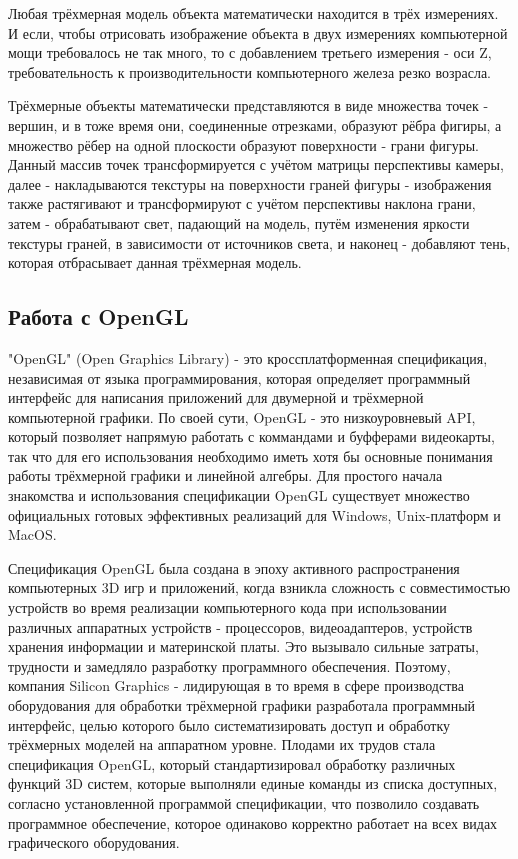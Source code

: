 Любая трёхмерная модель объекта математически находится в трёх измерениях. И если, чтобы отрисовать изображение объекта в двух измерениях компьютерной мощи требовалось не так много, то с добавлением третьего измерения - оси Z, требовательность к производительности компьютерного железа резко возрасла.

Трёхмерные объекты математически представляются в виде множества точек - вершин, и в тоже время они, соединенные отрезками, образуют рёбра фигиры, а множество рёбер на одной плоскости образуют поверхности - грани фигуры. Данный массив точек трансформируется с учётом матрицы перспективы камеры, далее - накладываются текстуры на поверхности граней фигуры - изображения также растягивают и трансформируют с учётом перспективы наклона грани, затем - обрабатывают свет, падающий на модель, путём изменения яркости текстуры граней, в зависимости от источников света, и наконец - добавляют тень, которая отбрасывает данная трёхмерная модель.
\subsection{Работа с OpenGL}

"OpenGL" (Open Graphics Library) - это кроссплатформенная спецификация, независимая от языка программирования, которая определяет программный интерфейс для написания приложений для двумерной и трёхмерной компьютерной графики. По своей сути, OpenGL - это низкоуровневый API, который позволяет напрямую работать с коммандами и буфферами видеокарты, так что для его использования необходимо иметь хотя бы основные понимания работы трёхмерной графики и линейной алгебры. Для простого начала знакомства и использования спецификации OpenGL существует множество официальных готовых эффективных реализаций для Windows, Unix-платформ и MacOS.

Спецификация OpenGL была создана в эпоху активного распространения компьютерных 3D игр и приложений, когда взникла сложность с совместимостью устройств во время реализации компьютерного кода при использовании различных аппаратных устройств - процессоров, видеоадаптеров, устройств хранения информации и материнской платы. Это вызывало сильные затраты, трудности и замедляло разработку программного обеспечения. Поэтому, компания Silicon Graphics - лидирующая в то время в сфере производства оборудования для обработки трёхмерной графики разработала программный интерфейс, целью которого было систематизировать доступ и обработку трёхмерных моделей на аппаратном уровне. Плодами их трудов стала спецификация OpenGL, который стандартизировал обработку различных функций 3D систем, которые выполняли единые команды из списка доступных, согласно установленной программой спецификации, что позволило создавать программное обеспечение, которое одинаково корректно работает на всех видах графического оборудования.

